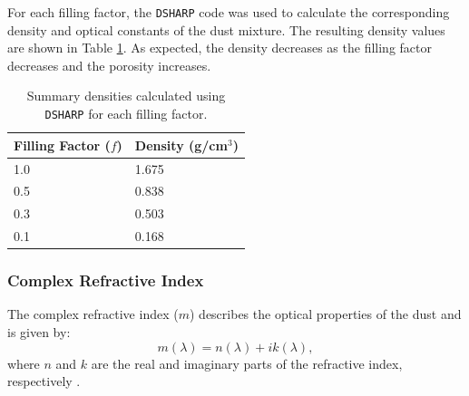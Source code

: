 
For each filling factor, the \texttt{DSHARP} code was used to calculate the corresponding density and optical constants of the dust mixture. The resulting density values are shown in Table \ref{tab:dsharp_density}. As expected, the density decreases as the filling factor decreases and the porosity increases.  

 


\begin{table}[h!]
\centering
\caption{Summary densities calculated using \texttt{DSHARP} for each filling factor.}
\begin{tabular}{ll}
\toprule
\textbf{Filling Factor (\boldmath$f$)} &
\textbf{Density (g/cm\boldmath$^3$)} \\
\midrule
1.0    & 1.675 \\
0.5 & 0.838 \\
0.3  & 0.503 \\
0.1 & 0.168 \\
\bottomrule
\end{tabular}
\label{tab:dsharp_density}
\end{table}








\subsubsection{Complex Refractive Index}
The complex refractive index ($m$) describes the optical properties of the dust and is given by:
\begin{equation}
 m(\lambda) = n(\lambda) + ik(\lambda),
\end{equation}
\noindent where $n$ and $k$ are the real and imaginary parts of the refractive index, respectively \citep{Zhang2023}. 


